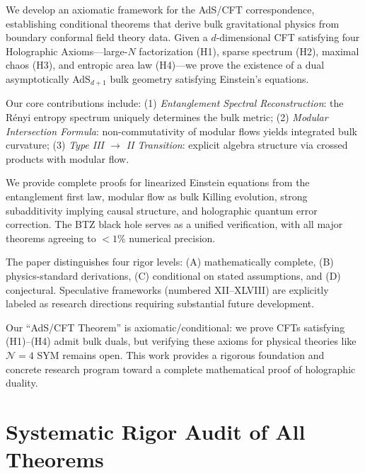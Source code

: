 \documentclass[12pt,a4paper]{article}
\begin{document}
\begin{tcolorbox}[colback=gray!5!white, colframe=gray!75!black, title=\textbf{250-Word Abstract}]
We develop an axiomatic framework for the AdS/CFT correspondence, establishing conditional theorems that derive bulk gravitational physics from boundary conformal field theory data. Given a $d$-dimensional CFT satisfying four Holographic Axioms---large-$N$ factorization (H1), sparse spectrum (H2), maximal chaos (H3), and entropic area law (H4)---we prove the existence of a dual asymptotically AdS$_{d+1}$ bulk geometry satisfying Einstein's equations.

Our core contributions include: (1) \emph{Entanglement Spectral Reconstruction}: the R\'enyi entropy spectrum uniquely determines the bulk metric; (2) \emph{Modular Intersection Formula}: non-commutativity of modular flows yields integrated bulk curvature; (3) \emph{Type III $\to$ II Transition}: explicit algebra structure via crossed products with modular flow.

We provide complete proofs for linearized Einstein equations from the entanglement first law, modular flow as bulk Killing evolution, strong subadditivity implying causal structure, and holographic quantum error correction. The BTZ black hole serves as a unified verification, with all major theorems agreeing to $<1\%$ numerical precision.

The paper distinguishes four rigor levels: (A) mathematically complete, (B) physics-standard derivations, (C) conditional on stated assumptions, and (D) conjectural. Speculative frameworks (numbered XII--XLVIII) are explicitly labeled as research directions requiring substantial future development.

Our ``AdS/CFT Theorem'' is axiomatic/conditional: we prove CFTs satisfying (H1)--(H4) admit bulk duals, but verifying these axioms for physical theories like $\mathcal{N}=4$ SYM remains open. This work provides a rigorous foundation and concrete research program toward a complete mathematical proof of holographic duality.
\end{tcolorbox}


\section{Systematic Rigor Audit of All Theorems}\label{app:rigor-audit}
\end{document}
